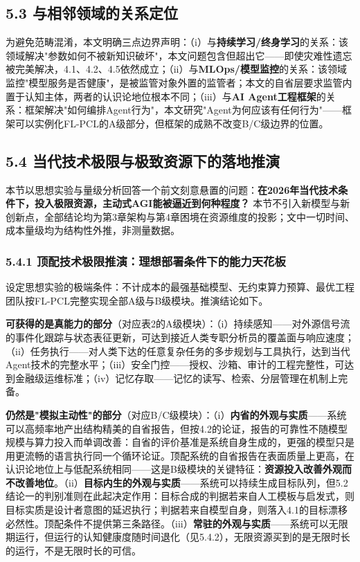\documentclass[11pt,a4paper]{ctexart}
\begin{document}
\subsection{5.3 与相邻领域的关系定位}

为避免范畴混淆，本文明确三点边界声明：（i）与\textbf{持续学习/终身学习}的关系：该领域解决"参数如何不被新知识破坏"，本文问题包含但超出它——即使灾难性遗忘被完美解决，4.1、4.2、4.5依然成立；（ii）与\textbf{MLOps/模型监控}的关系：该领域监控"模型服务是否健康"，是被监管对象外置的监管者；本文的自省层要求监管内置于认知主体，两者的认识论地位根本不同；（iii）与\textbf{AI Agent工程框架}的关系：框架解决"如何编排Agent行为"，本文研究"Agent为何应该有任何行为"——框架可以实例化FL-PCL的A级部分，但框架的成熟不改变B/C级边界的位置。

\subsection{5.4 当代技术极限与极致资源下的落地推演}

本节以思想实验与量级分析回答一个前文刻意悬置的问题：\textbf{在2026年当代技术条件下，投入极限资源，主动式AGI能被逼近到何种程度？} 本节不引入新模型与新创新点，全部结论均为第3章架构与第4章困境在资源维度的投影；文中一切时间、成本量级均为结构性外推，非测量数据。

\subsubsection{5.4.1 顶配技术极限推演：理想部署条件下的能力天花板}

设定思想实验的极端条件：不计成本的最强基础模型、无约束算力预算、最优工程团队按FL-PCL完整实现全部A级与B级模块。推演结论如下。

\textbf{可获得的是真能力的部分}（对应表2的A级模块）：（i）持续感知——对外源信号流的事件化跟踪与状态表征更新，可达到接近人类专职分析员的覆盖面与响应速度；（ii）任务执行——对人类下达的任意复杂任务的多步规划与工具执行，达到当代Agent技术的完整水平；（iii）安全门控——授权、沙箱、审计的工程完整性，可达到金融级运维标准；（iv）记忆存取——记忆的读写、检索、分层管理在机制上完备。

\textbf{仍然是"模拟主动性"的部分}（对应B/C级模块）：（i）\textbf{内省的外观与实质}——系统可以高频率地产出结构精美的自省报告，但按4.2的论证，报告的可靠性不随模型规模与算力投入而单调改善：自省的评价基准是系统自身生成的，更强的模型只是用更流畅的语言执行同一个循环论证。顶配系统的自省报告在表面质量上更高，在认识论地位上与低配系统相同——这是B级模块的关键特征：\textbf{资源投入改善外观而不改善地位}。（ii）\textbf{目标内生的外观与实质}——系统可以持续生成目标队列，但5.2结论一的判别准则在此起决定作用：目标合成的判据若来自人工模板与启发式，则目标实质是设计者意图的延迟执行；判据若来自模型自身，则落入4.1的目标漂移必然性。顶配条件不提供第三条路径。（iii）\textbf{常驻的外观与实质}——系统可以无限期运行，但运行的认知健康度随时间退化（见5.4.2），无限资源买到的是无限时长的运行，不是无限时长的可信。
\end{document}
